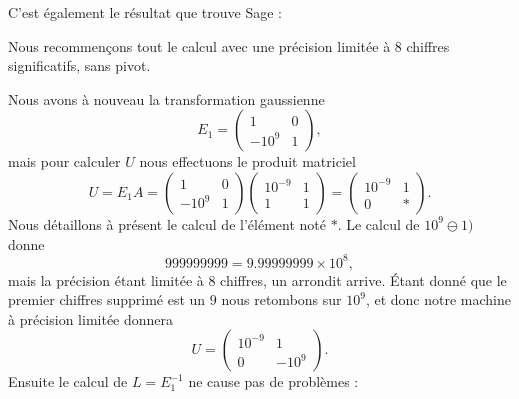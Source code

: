 \begin{example}
    C'est également le résultat que trouve Sage :
    
\end{example}

\begin{example}     \label{EXooNVRNooJgQmQc}
    Nous recommençons tout le calcul avec une précision limitée à \( 8\) chiffres significatifs, sans pivot.

    Nous avons à nouveau la transformation gaussienne
    \begin{equation}
        E_1=\begin{pmatrix}
            1    &   0    \\ 
            -10^9    &   1    
        \end{pmatrix},
    \end{equation}
    mais pour calculer \( U\) nous effectuons le produit matriciel
    \begin{equation}
        U=E_1A=\begin{pmatrix}
            1    &   0    \\ 
            -10^9    &   1    
        \end{pmatrix}\begin{pmatrix}
            10^{-9}   &   1    \\ 
            1    &   1    
        \end{pmatrix}=\begin{pmatrix}
            10^{-9}    &   1    \\ 
            0    &   *    
        \end{pmatrix}.
    \end{equation}
    Nous détaillons à présent le calcul de l'élément noté \( *\). Le calcul de \( 10^9\ominus 1)\) donne
    \begin{equation}
        999999999=9.99999999\times 10^{8},
    \end{equation}
    mais la précision étant limitée à \( 8\) chiffres, un arrondit arrive. Étant donné que le premier chiffres supprimé est un \( 9\) nous retombons sur \( 10^9\), et donc notre machine à précision limitée donnera
    \begin{equation}
        U=\begin{pmatrix}
            10^{-9}    &   1    \\ 
            0    &   -10^{9}    
        \end{pmatrix}.
    \end{equation}
    Ensuite le calcul de \( L=E_1^{-1}\) ne cause pas de problèmes :

\end{example}
